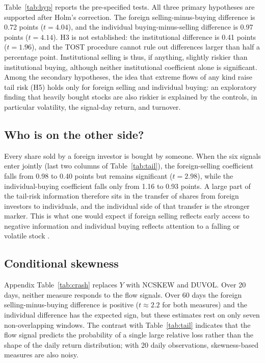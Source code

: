 \documentclass[11pt]{article}
\begin{document}
Table~\ref{tab:hyp} reports the pre-specified tests. All three primary hypotheses are supported after Holm's
correction. The foreign selling-minus-buying difference is 0.72 points ($t=4.04$), and the individual
buying-minus-selling difference is 0.97 points ($t=4.14$). H3 is not established: the institutional difference is 0.41
points ($t=1.96$), and the TOST procedure cannot rule out differences larger than half a percentage point. Institutional
selling is thus, if anything, slightly riskier than institutional buying, although neither institutional coefficient
alone is significant. Among the secondary hypotheses, the idea that extreme flows of any kind raise tail risk (H5) holds
only for foreign selling and individual buying: an exploratory finding that heavily bought stocks are also riskier is
explained by the controls, in particular volatility, the signal-day return, and turnover.




\subsection{Who is on the other side?}
Every share sold by a foreign investor is bought by someone. When the six signals enter jointly (last two columns of
Table~\ref{tab:tail}), the foreign-selling coefficient falls from 0.98 to 0.40 points but remains significant
($t=2.98$), while the individual-buying coefficient falls only from 1.16 to 0.93 points. A large part of the
tail-risk information therefore sits in the transfer of shares from foreign investors to individuals, and the
individual side of that transfer is the stronger marker. This is what one would expect if foreign selling reflects
early access to negative information and individual buying reflects attention to a falling or volatile stock
\citep{barber2008}.

\subsection{Conditional skewness}
Appendix Table~\ref{tab:crash} replaces $Y$ with NCSKEW and DUVOL. Over 20 days, neither measure responds to the flow
signals. Over 60 days the foreign selling-minus-buying difference is positive ($t\approx2.2$ for both measures) and the
individual difference has the expected sign, but these estimates rest on only seven non-overlapping windows. The
contrast with Table~\ref{tab:tail} indicates that the flow signal predicts the probability of a single large relative
loss rather than the shape of the daily return distribution; with 20 daily observations, skewness-based measures are
also noisy.
\end{document}
